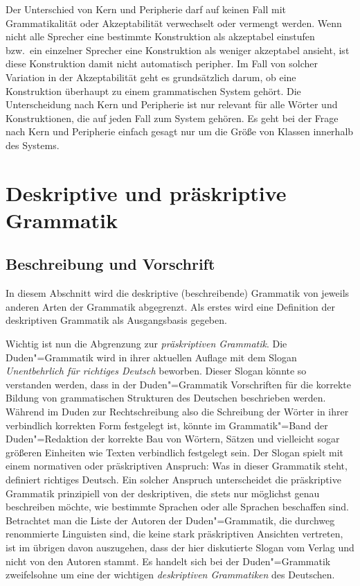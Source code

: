 
Der Unterschied von Kern und Peripherie darf auf keinen Fall mit Grammatikalität oder Akzeptabilität verwechselt oder vermengt werden.
Wenn nicht alle Sprecher eine bestimmte Konstruktion als akzeptabel einstufen bzw.\ ein einzelner Sprecher eine Konstruktion als weniger akzeptabel ansieht, ist diese Konstruktion damit nicht automatisch peripher.
Im Fall von solcher Variation in der Akzeptabilität geht es grundsätzlich darum, ob eine Konstruktion überhaupt zu einem grammatischen System gehört.
Die Unterscheidung nach Kern und Peripherie ist nur relevant für alle Wörter und Konstruktionen, die auf jeden Fall zum System gehören.
Es geht bei der Frage nach Kern und Peripherie einfach gesagt nur um die Größe von Klassen innerhalb des Systems.

\section{Deskriptive und präskriptive Grammatik}

\label{sec:deskriptivnormativ}

\subsection{Beschreibung und Vorschrift}

In diesem Abschnitt wird die deskriptive (beschreibende) Grammatik von jeweils anderen Arten der Grammatik abgegrenzt.
Als erstes wird eine Definition der deskriptiven Grammatik als Ausgangsbasis gegeben.


Wichtig ist nun die Abgrenzung zur \textit{präskriptiven Grammatik}.
Die Duden"=Grammatik \citep{Duden8} wird in ihrer aktuellen Auflage mit dem Slogan \textit{Unentbehrlich für richtiges Deutsch} beworben.
Dieser Slogan könnte so verstanden werden, dass in der Duden"=Grammatik Vorschriften für die korrekte Bildung von grammatischen Strukturen des Deutschen beschrieben werden.
Während im Duden zur Rechtschreibung also die Schreibung der Wörter in ihrer verbindlich korrekten Form festgelegt ist, könnte im Grammatik"=Band der Duden"=Redaktion der korrekte Bau von Wörtern, Sätzen und vielleicht sogar größeren Einheiten wie Texten verbindlich festgelegt sein.
Der Slogan spielt mit einem normativen oder präskriptiven Anspruch:
Was in dieser Grammatik steht, definiert richtiges Deutsch.
Ein solcher Anspruch unterscheidet die präskriptive Grammatik prinzipiell von der deskriptiven, die stets nur möglichst genau beschreiben möchte, wie bestimmte Sprachen oder alle Sprachen beschaffen sind.
Betrachtet man die Liste der Autoren der Duden"=Grammatik, die durchweg renommierte Linguisten sind, die keine stark präskriptiven Ansichten vertreten, ist im übrigen davon auszugehen, dass der hier diskutierte Slogan vom Verlag und nicht von den Autoren stammt. 
Es handelt sich bei der Duden"=Grammatik zweifelsohne um eine der wichtigen \textit{deskriptiven Grammatiken} des Deutschen.

